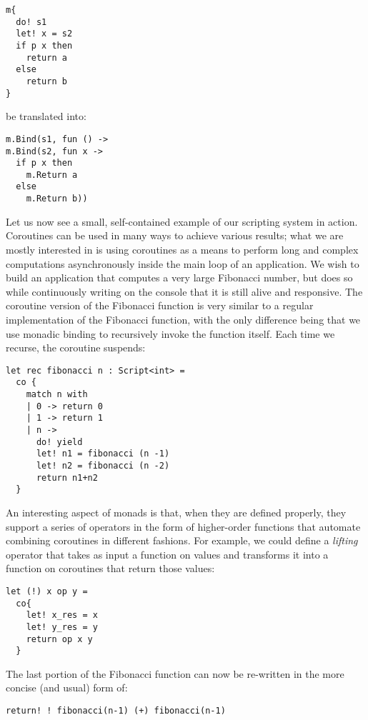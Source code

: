 \begin{lstlisting}
m{
  do! s1
  let! x = s2
  if p x then
    return a
  else
    return b
}
\end{lstlisting}

 be translated into:

\begin{lstlisting}
m.Bind(s1, fun () ->
m.Bind(s2, fun x ->
  if p x then
    m.Return a
  else 
    m.Return b))
\end{lstlisting}

Let us now see a small, self-contained example of our scripting system in action. Coroutines can be used in many ways to achieve various results; what we are mostly interested in is using coroutines as a means to perform long and complex computations asynchronously inside the main loop of an application. We wish to build an application that computes a very large Fibonacci number, but does so while continuously writing on the console that it is still alive and
responsive. The coroutine version of the Fibonacci function is very similar to a regular implementation of the Fibonacci function, with the only difference being that we use monadic binding to recursively invoke the function itself. Each time we recurse,
the coroutine suspends:

\begin{lstlisting}
let rec fibonacci n : Script<int> =
  co {
    match n with
    | 0 -> return 0
    | 1 -> return 1
    | n ->
      do! yield
      let! n1 = fibonacci (n -1)
      let! n2 = fibonacci (n -2)
      return n1+n2
  }
\end{lstlisting}

An interesting aspect of monads is that, when they are defined properly, they support a series of operators in the form of higher-order functions that automate combining coroutines in different fashions. For example, we could define a \textit{lifting} operator that takes as input a function on values and transforms it into a function on coroutines that return those values:

\begin{lstlisting}
let (!) x op y =  
  co{
    let! x_res = x
    let! y_res = y
    return op x y
  }
\end{lstlisting}

The last portion of the Fibonacci function can now be re-written in the more concise (and usual) form of:

\begin{lstlisting}
return! ! fibonacci(n-1) (+) fibonacci(n-1)
\end{lstlisting}

